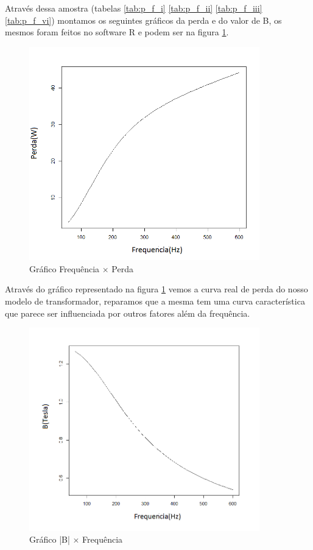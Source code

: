\documentclass[
	12pt,				%
	openright,			%
	twoside,			%
	a4paper,			%
	english,			%
	french,				%
	spanish,			%
	brazil,				%
	]{abntex2}
\begin{document}
Através dessa amostra (tabelas \ref{tab:p_f_i} \ref{tab:p_f_ii} \ref{tab:p_f_iii} \ref{tab:p_f_vi}) montamos os seguintes gráficos da perda e do valor de B, os mesmos foram feitos no software R e podem ser na figura \ref{fig:gra_p_f}.

\begin{figure}[H]
    \centering
    \includegraphics[width=10cm]{img/perda_frequencia.png}
    \caption{Gráfico Frequência $\times$ Perda }
    \label{fig:gra_p_f}
\end{figure}

Através do gráfico representado na figura \ref{fig:gra_p_f} vemos a curva real de perda do nosso modelo de transformador, reparamos que a mesma tem uma curva característica que parece ser influenciada por outros fatores além da frequência.

\begin{figure}[H]
    \centering
    \includegraphics[width=10cm]{img/b_frequencia.png}
    \caption{Gráfico |B| $\times$ Frequência }
    \label{fig:gra_b_f}
\end{figure}
\end{document}
